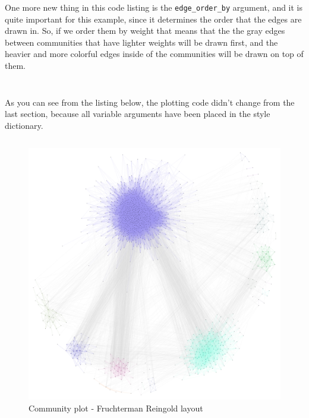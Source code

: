 \documentclass[12pt, a4paper]{article}
\begin{document}
One more new thing in this code listing is the \texttt{edge\_order\_by} argument, and it is quite important for this example, since it determines the order that the edges are drawn in. So, if we order them by weight that means that the the gray edges between communities that have lighter weights will be drawn first, and the heavier and more colorful edges inside of the communities will be drawn on top of them.

\bgroup
  \inputminted[linenos, breaklines=true, fontsize=\scriptsize, firstnumber=last]{python}{src/youtube/hdg_com/5_styling_prop.py}
  \label{listing:iplot_5sg}
\egroup

\bgroup
  \inputminted[linenos, breaklines=true, fontsize=\scriptsize, firstnumber=last]{python}{src/youtube/hdg_com/6_style_dict.py}
  \label{listing:iplot_6sd}
\egroup


As you can see from the listing below, the plotting code didn't change from the last section, because all variable arguments have been placed in the style dictionary.

\bgroup
  \inputminted[linenos, breaklines=true, fontsize=\scriptsize, firstnumber=last]{python}{src/youtube/hdg_com/7_plotting.py}
  \label{listing:iplot_7sv}
\egroup

\begin{figure}[ht]
    \centering
    \includegraphics[width=\textwidth]{src/youtube/hdg_com/hdg_com}
    \caption{Community plot - Fruchterman Reingold layout}
    \label{fig:hdg_com}
\end{figure}
\end{document}
